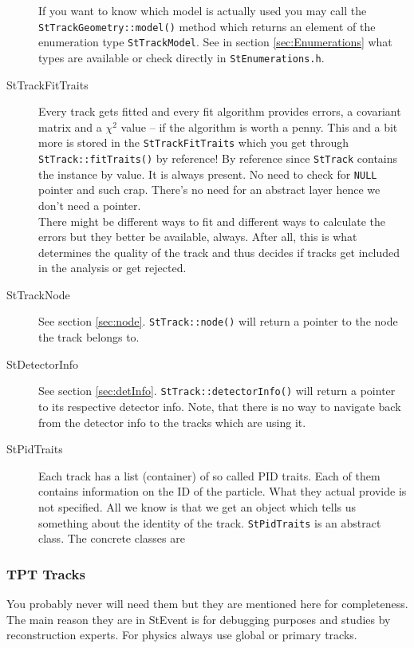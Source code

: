 \documentclass[twoside]{article}
\begin{document}
\begin{description}
    If you want to know which model is actually used you may call the
    \texttt{StTrackGeometry::model()} method which returns an element
    of the enumeration type \texttt{StTrackModel}. See in section
    \ref{sec:Enumerations} what types are available or check directly
    in \texttt{StEnumerations.h}.
    
\item[StTrackFitTraits]  Every track gets
    fitted and every fit algorithm provides errors, a covariant matrix
    and a $\chi^2$ value -- if the algorithm is worth a penny.  This
    and a bit more is stored in the \texttt{StTrackFitTraits} which
    you get through \texttt{StTrack::fitTraits()} by reference! By
    reference since \texttt{StTrack} contains the instance by value.
    It is always present. No need to check for \texttt{NULL} pointer
    and such crap. There's no need for an abstract
    layer hence we don't need a pointer.\\
    There might be different ways to fit and different ways to
    calculate the errors but they better be available, always. After
    all, this is what determines the quality of the track and thus
    decides if tracks get included in the analysis or get rejected.
    
\item[StTrackNode]  See section \ref{sec:node}.
    \texttt{StTrack::node()} will return a pointer to the node the
    track belongs to.
    
\item[StDetectorInfo]  See section
    \ref{sec:detInfo}.  \texttt{StTrack::detectorInfo()} will return a
    pointer to its respective detector info. Note, that there is no
    way to navigate back from the detector info to the tracks which
    are using it.
    
\item[StPidTraits]  Each track has a list
    (container) of so called PID traits. Each of them contains
    information on the ID of the particle. What they actual provide is
    not specified. All we know is that we get an object which tells us
    something about the identity of the track.  \texttt{StPidTraits}
    is an abstract class. The concrete classes are
\end{description}

\subsubsection{TPT Tracks}
\label{sec:tptTracks} 
You probably never will need them but they are mentioned here for completeness.
The main reason they are in StEvent is for debugging purposes and studies by reconstruction
experts. For physics always use global or primary tracks. 
\end{document}
